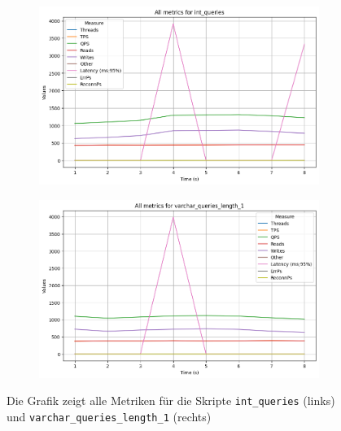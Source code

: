 \begin{figure}[!ht]
    \centering
    \begin{subfigure}[t]{0.48\textwidth}
        \centering
        \includegraphics[width=\textwidth]{PNGs/Join_Type/int_queries}
        \label{join-typ-int_queries}
    \end{subfigure}
    \hfill
    \begin{subfigure}[t]{0.48\textwidth}
        \centering
        \includegraphics[width=\textwidth]{PNGs/Join_Type/varchar_queries_length_1}
        \label{join-typ-varchar_queries_length_1}
    \end{subfigure}
    \caption[Join-Typ: Skriptvergleich]{Die Grafik zeigt alle Metriken für die Skripte \texttt{int\_queries} (links) und \texttt{varchar\_queries\_length\_1} (rechts)}
    \label{fig:join-typ-comp-script}
\end{figure}

